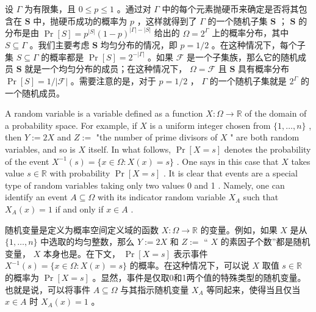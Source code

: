 \documentclass[10pt]{article}
\begin{document}
\begin{tcolorbox}\relax
设 \(\Gamma\) 为有限集，且 \(0 \leq  p \leq  1\) 。通过对 \(\Gamma\) 中的每个元素抛硬币来确定是否将其包含在 \(\mathbf{S}\) 中，抛硬币成功的概率为 \(p\) ，这样就得到了 \(\Gamma\) 的一个随机子集 \(\mathbf{S}\) ； \(\mathbf{S}\) 的分布是由 \(\Pr \left\lbrack  S\right\rbrack   = {p}^{\left| S\right| }{\left( 1 - p\right) }^{\left| \Gamma \right|  - \left| S\right| }\) 给出的 \(\Omega  = {2}^{\Gamma }\) 上的概率分布，其中 \(S \subseteq  \Gamma\) 。我们主要考虑 \(\mathbf{S}\) 均匀分布的情况，即 \(p = 1/2\) 。在这种情况下，每个子集 \(S \subseteq  \Gamma\) 的概率都是 \(\Pr \left\lbrack  S\right\rbrack   = {2}^{-\left| \Gamma \right| }\) 。如果 \(\mathcal{F}\) 是一个子集族，那么它的随机成员 \(\mathbf{S}\) 就是一个均匀分布的成员；在这种情况下， \(\Omega  = \mathcal{F}\) 且 \(\mathbf{S}\) 具有概率分布 \(\Pr \left\lbrack  S\right\rbrack   = 1/\left| \mathcal{F}\right|\) 。需要注意的是，对于 \(p = 1/2\) ， \(\Gamma\) 的一个随机子集就是 \({2}^{\Gamma }\) 的一个随机成员。
\end{tcolorbox}

A random variable is a variable defined as a function \(X : \Omega  \rightarrow  \mathbb{R}\) of the domain of a probability space. For example, if \(X\) is a uniform integer chosen from \(\{ 1,\ldots ,n\}\) , then \(Y \mathrel{\text{ := }} {2X}\) and \(Z \mathrel{\text{ := }}\) "the number of prime divisors of \(X\) " are both random variables, and so is \(X\) itself. In what follows, \(\Pr \left\lbrack  {X = s}\right\rbrack\) denotes the probability of the event \({X}^{-1}\left( s\right)  = \{ x \in  \Omega  : X\left( x\right)  = s\}\) . One says in this case that \(X\) takes value \(s \in  \mathbb{R}\) with probability \(\Pr \left\lbrack  {X = s}\right\rbrack\) . It is clear that events are a special type of random variables taking only two values 0 and 1 . Namely, one can identify an event \(A \subseteq  \Omega\) with its indicator random variable \({X}_{A}\) such that \({X}_{A}\left( x\right)  = 1\) if and only if \(x \in  A\) .

\begin{tcolorbox}\relax
随机变量是定义为概率空间定义域的函数 \(X : \Omega  \rightarrow  \mathbb{R}\) 的变量。例如，如果 \(X\) 是从 \(\{ 1,\ldots ,n\}\) 中选取的均匀整数，那么 \(Y \mathrel{\text{ := }} {2X}\) 和 \(Z \mathrel{\text{ := }}\) “ \(X\) 的素因子个数”都是随机变量， \(X\) 本身也是。在下文， \(\Pr \left\lbrack  {X = s}\right\rbrack\) 表示事件 \({X}^{-1}\left( s\right)  = \{ x \in  \Omega  : X\left( x\right)  = s\}\) 的概率。在这种情况下，可以说 \(X\) 取值 \(s \in  \mathbb{R}\) 的概率为 \(\Pr \left\lbrack  {X = s}\right\rbrack\) 。显然，事件是仅取0和1两个值的特殊类型的随机变量。也就是说，可以将事件 \(A \subseteq  \Omega\) 与其指示随机变量 \({X}_{A}\) 等同起来，使得当且仅当 \(x \in  A\) 时 \({X}_{A}\left( x\right)  = 1\) 。
\end{tcolorbox}
\end{document}
